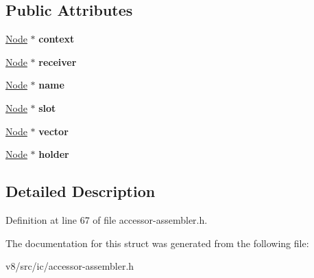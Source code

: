 \subsection*{Public Attributes}
\begin{DoxyCompactItemize}
\item 
\mbox{\label{structv8_1_1internal_1_1AccessorAssembler_1_1LoadICParameters_aa7c8d0855152d7f29f7884f3d174253f}} 
\mbox{\hyperlink{classv8_1_1internal_1_1compiler_1_1Node}{Node}} $\ast$ {\bfseries context}
\item 
\mbox{\label{structv8_1_1internal_1_1AccessorAssembler_1_1LoadICParameters_aca4f81dc117e459a3823a146a8610504}} 
\mbox{\hyperlink{classv8_1_1internal_1_1compiler_1_1Node}{Node}} $\ast$ {\bfseries receiver}
\item 
\mbox{\label{structv8_1_1internal_1_1AccessorAssembler_1_1LoadICParameters_a71da5f4415f22bbbbc0775117ed8964e}} 
\mbox{\hyperlink{classv8_1_1internal_1_1compiler_1_1Node}{Node}} $\ast$ {\bfseries name}
\item 
\mbox{\label{structv8_1_1internal_1_1AccessorAssembler_1_1LoadICParameters_a7bffe8e063c04bae3b7e36e38d7e127a}} 
\mbox{\hyperlink{classv8_1_1internal_1_1compiler_1_1Node}{Node}} $\ast$ {\bfseries slot}
\item 
\mbox{\label{structv8_1_1internal_1_1AccessorAssembler_1_1LoadICParameters_a56b7be5eaa10c161943e8a95ad54e3fe}} 
\mbox{\hyperlink{classv8_1_1internal_1_1compiler_1_1Node}{Node}} $\ast$ {\bfseries vector}
\item 
\mbox{\label{structv8_1_1internal_1_1AccessorAssembler_1_1LoadICParameters_afb8989f532af06bb7012fc137406cf60}} 
\mbox{\hyperlink{classv8_1_1internal_1_1compiler_1_1Node}{Node}} $\ast$ {\bfseries holder}
\end{DoxyCompactItemize}


\subsection{Detailed Description}


Definition at line 67 of file accessor-\/assembler.\+h.



The documentation for this struct was generated from the following file\+:\begin{DoxyCompactItemize}
\item 
v8/src/ic/accessor-\/assembler.\+h\end{DoxyCompactItemize}
